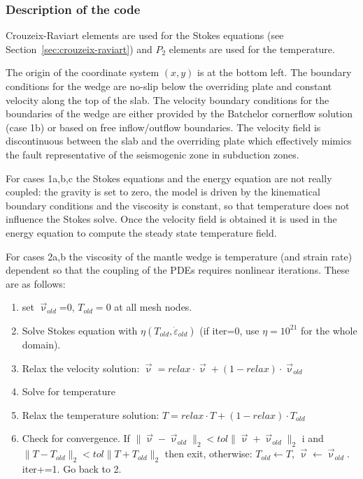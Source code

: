 \subsubsection*{Description of the code}


Crouzeix-Raviart elements are used for the Stokes equations (see Section~\ref{sec:crouzeix-raviart}) 
and $P_2$ elements are used for the temperature. 

The origin of the coordinate system $(x,y)$ is at the bottom left. 
The boundary conditions for the
wedge are no-slip below the overriding plate and constant velocity along the top of the slab. 
The velocity boundary conditions for the boundaries of the wedge are either provided by the Batchelor 
cornerflow solution (case 1b) or based on free inflow/outflow boundaries. 
The velocity field is discontinuous between the slab and the overriding plate which 
effectively mimics the fault representative of the seismogenic zone in subduction zones.

For cases 1a,b,c the Stokes equations and the energy equation are not really coupled: 
the gravity is set to zero, the model is driven by the kinematical boundary conditions 
and the viscosity is constant, so that temperature does not 
influence the Stokes solve. Once the velocity field is obtained it is used 
in the energy equation to compute the steady state temperature field. 

For cases 2a,b the viscosity of the mantle 
wedge is temperature (and strain rate) dependent so that the coupling of the PDEs 
requires nonlinear iterations. These are as follows:
\begin{enumerate}
\item set $\vec{\upnu}_{old}$=0, $T_{old}=0$ at all mesh nodes.
\item Solve Stokes equation with $\eta(T_{old},\dot{\varepsilon}_{old})$ (if iter=0, use $\eta=10^{21}$ for the whole domain).
\item Relax the velocity solution: $\vec\upnu = relax \cdot \vec{\upnu} + (1-relax)\cdot \vec{\upnu}_{old}$
\item Solve for temperature 
\item Relax the temperature solution: $T=relax \cdot T + (1-relax) \cdot T_{old}$
\item Check for convergence. If $\|\vec\upnu-\vec\upnu_{old}\|_2 < tol \| \vec\upnu + \vec\upnu_{old}  \|_2$ i
and $\|T-T_{old}\|_2 < tol \| T + T_{old}  \|_2$ then exit, 
otherwise: $T_{old} \leftarrow T$, $ \vec\upnu \leftarrow \vec\upnu_{old} $. iter+=1. Go back to 2. 
\end{enumerate}

